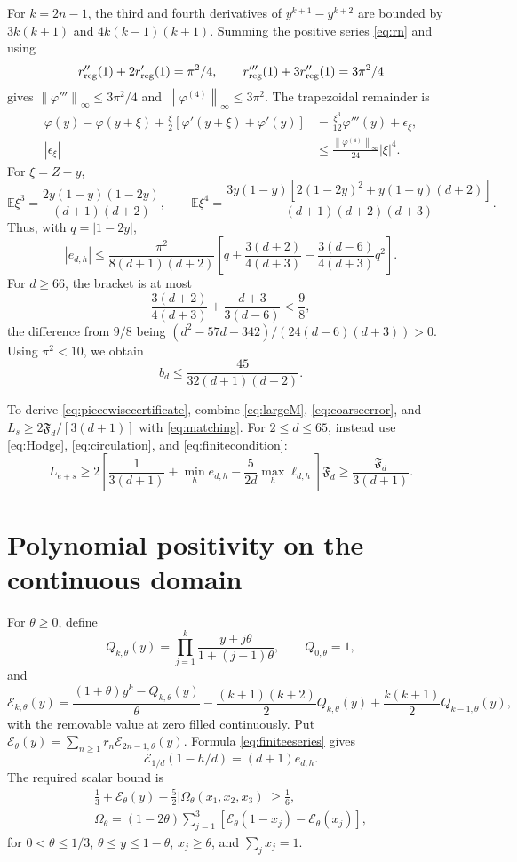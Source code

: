 \documentclass[11pt]{amsart}
\theoremstyle{remark}
\theoremstyle{plain}
\numberwithin{equation}{section}
\newcommand{\norm}[1]{\left\|#1\right\|}
\newcommand{\Fdef}{\mathfrak F_d}
\begin{document}
For \(k=2n-1\), the third and fourth derivatives of
\(y^{k+1}-y^{k+2}\) are bounded by \(3k(k+1)\) and
\(4k(k-1)(k+1)\). Summing the positive series \eqref{eq:rn} and using
\[
 r_{\rm reg}''(1)+2r_{\rm reg}'(1)=\pi^2/4,\qquad
 r_{\rm reg}'''(1)+3r_{\rm reg}''(1)=3\pi^2/4
\]
gives
\(\norm{\varphi'''}_\infty\le3\pi^2/4\) and
\(\norm{\varphi^{(4)}}_\infty\le3\pi^2\).
The trapezoidal remainder is
\[
 \begin{split}
 \varphi(y)-\varphi(y+\xi)
 +\frac\xi2[\varphi'(y+\xi)+\varphi'(y)]
 &=\frac{\xi^3}{12}\varphi'''(y)+\epsilon_\xi,\\
 |\epsilon_\xi|&\le
 \frac{\norm{\varphi^{(4)}}_\infty}{24}|\xi|^4.
 \end{split}
\]
For \(\xi=Z-y\),
\[
 \mathbb E\xi^3=
 \frac{2y(1-y)(1-2y)}{(d+1)(d+2)},\qquad
 \mathbb E\xi^4=
 \frac{3y(1-y)[2(1-2y)^2+y(1-y)(d+2)]}
 {(d+1)(d+2)(d+3)}.
\]
Thus, with \(q=|1-2y|\),
\[
 |e_{d,h}|\le
 \frac{\pi^2}{8(d+1)(d+2)}
 \left[q+\frac{3(d+2)}{4(d+3)}
 -\frac{3(d-6)}{4(d+3)}q^2\right].
\]
For \(d\ge66\), the bracket is at most
\[
 \frac{3(d+2)}{4(d+3)}+\frac{d+3}{3(d-6)}<\frac98,
\]
the difference from \(9/8\) being
\((d^2-57d-342)/(24(d-6)(d+3))>0\).
Using \(\pi^2<10\), we obtain
\begin{equation}\label{eq:largeM}
 b_d\le\frac{45}{32(d+1)(d+2)}.
\end{equation}

To derive \eqref{eq:piecewisecertificate}, combine
\eqref{eq:largeM}, \eqref{eq:coarseerror}, and
\(L_s\ge2\Fdef/[3(d+1)]\) with \eqref{eq:matching}.
For \(2\le d\le65\), instead use \eqref{eq:Hodge},
\eqref{eq:circulation}, and \eqref{eq:finitecondition}:
\[
 L_{e+s}\ge
 2\left[
 \frac1{3(d+1)}+\min_he_{d,h}
 -\frac5{2d}\max_h\ell_{d,h}
 \right]\Fdef
 \ge\frac{\Fdef}{3(d+1)}.
\]

\section{Polynomial positivity on the continuous domain}
\label{app:continuous}

For \(\theta\ge0\), define
\[
 Q_{k,\theta}(y)=
 \prod_{j=1}^k\frac{y+j\theta}{1+(j+1)\theta},
 \qquad Q_{0,\theta}=1,
\]
and
\[
 \mathcal E_{k,\theta}(y)=
 \frac{(1+\theta)y^k-Q_{k,\theta}(y)}{\theta}
 -\frac{(k+1)(k+2)}2Q_{k,\theta}(y)
 +\frac{k(k+1)}2Q_{k-1,\theta}(y),
\]
with the removable value at zero filled continuously.
Put \(\mathcal E_\theta(y)=\sum_{n\ge1}r_n\mathcal E_{2n-1,\theta}(y)\).
Formula \eqref{eq:finiteeseries} gives
\begin{equation}\label{eq:Enormalization}
 \mathcal E_{1/d}(1-h/d)=(d+1)e_{d,h}.
\end{equation}
The required scalar bound is
\begin{equation}\label{eq:continuouslemma}
 \begin{gathered}
 \frac13+\mathcal E_\theta(y)
 -\frac52|\Omega_\theta(x_1,x_2,x_3)|\ge\frac16,\\
 \Omega_\theta=(1-2\theta)
 \sum_{j=1}^3[\mathcal E_\theta(1-x_j)-\mathcal E_\theta(x_j)],
 \end{gathered}
\end{equation}
for \(0<\theta\le1/3\), \(\theta\le y\le1-\theta\),
\(x_j\ge\theta\), and \(\sum_jx_j=1\).
\end{document}
